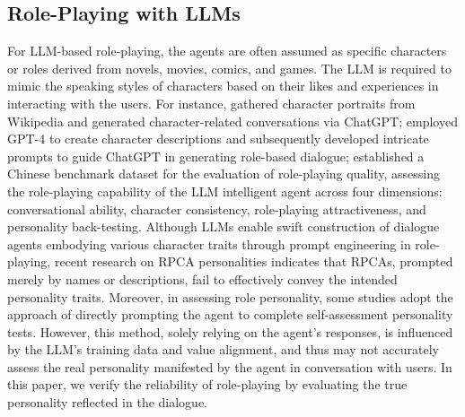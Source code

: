 \subsection{Role-Playing with LLMs}
For LLM-based role-playing, the agents are often assumed as specific characters or roles derived from novels, movies, comics, and games. The LLM is required to mimic the speaking styles of characters based on their likes and experiences in interacting with the users. For instance, \citet{shao2023character} gathered character portraits from Wikipedia and generated character-related conversations via ChatGPT; \citet{wang2023rolellm} employed GPT-4 \cite{achiam2023gpt} to create character descriptions and subsequently developed intricate prompts to guide ChatGPT in generating role-based dialogue; \citet{tu2024charactereval} established a Chinese benchmark dataset for the evaluation of role-playing quality, assessing the role-playing capability of the LLM intelligent agent across four dimensions: conversational ability, character consistency, role-playing attractiveness, and personality back-testing. Although LLMs enable swift construction of dialogue agents embodying various character traits through prompt engineering in role-playing, recent research on RPCA personalities \cite{huang2023chatgpt} indicates that RPCAs, prompted merely by names or descriptions, fail to effectively convey the intended personality traits. Moreover, in assessing role personality, some studies \cite{tu2024charactereval, huang2023chatgpt, wang2023does} adopt the approach of directly prompting the agent to complete self-assessment personality tests. However, this method, solely relying on the agent's responses, is influenced by the LLM's training data and value alignment, and thus may not accurately assess the real personality manifested by the agent in conversation with users. In this paper, we verify the reliability of role-playing by evaluating the true personality reflected in the dialogue.